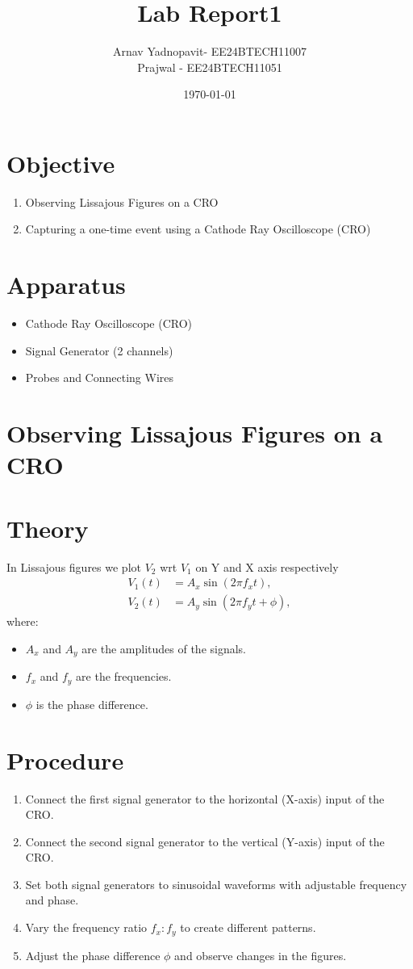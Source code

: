 \documentclass[a4paper,12pt]{article}
\title{Lab Report1}
\author{Arnav Yadnopavit- EE24BTECH11007\\Prajwal - EE24BTECH11051}
\date{\today}
\begin{document}
\maketitle
\section*{Objective}
\begin{enumerate}
    \item Observing Lissajous Figures on a CRO
    \item Capturing a one-time event using a Cathode Ray Oscilloscope (CRO)
\end{enumerate}
\section*{Apparatus}
\begin{itemize}
    \item Cathode Ray Oscilloscope (CRO)
    \item Signal Generator (2 channels)
    \item Probes and Connecting Wires
\end{itemize}
\section{Observing Lissajous Figures on a CRO}
\section*{Theory}
In Lissajous figures we plot $V_2$ wrt $V_1$ on Y and X axis respectively
\begin{align*}
    V_1(t) &= A_x \sin(2\pi f_x t), \\
    V_2(t) &= A_y \sin(2\pi f_y t + \phi),
\end{align*}
where:
\begin{itemize}
    \item $A_x$ and $A_y$ are the amplitudes of the signals.
    \item $f_x$ and $f_y$ are the frequencies.
    \item $\phi$ is the phase difference.
\end{itemize}
\section*{Procedure}
\begin{enumerate}
    \item Connect the first signal generator to the horizontal (X-axis) input of the CRO.
    \item Connect the second signal generator to the vertical (Y-axis) input of the CRO.
    \item Set both signal generators to sinusoidal waveforms with adjustable frequency and phase.
    \item Vary the frequency ratio $f_x : f_y$ to create different patterns.
    \item Adjust the phase difference $\phi$ and observe changes in the figures.
\end{enumerate}
\end{document}
